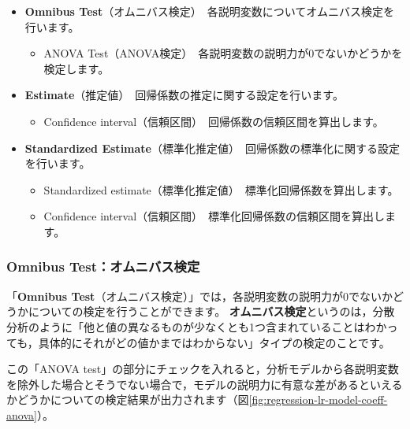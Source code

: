 \documentclass[
  12pt,
  a5jpaper,
  lualatex, ja=standard]{bxjsbook}
\providecommand{\tightlist}{%
  \setlength{\itemsep}{0pt}\setlength{\parskip}{0pt}}
\renewcommand{\emph}[1]{\textbf{\color{emph} #1}}
\newenvironment{jmvsettings}{%
	\begin{center}%
	\begin{tcolorbox}[%
		title=設定項目,
		colframe=gmoji,
		colbacktitle=gmoji,
		colback=gmoji!2!white,
		breakable,
		width=.9\textwidth,
		]\small\addtolength{\leftmargini}{-3\labelsep}%
	}%
	{\end{tcolorbox}\end{center}}
\begin{document}
\begin{jmvsettings}

\begin{itemize}
\tightlist
\item
  \textbf{Omnibus Test}（オムニバス検定）　各説明変数についてオムニバス検定を行います。

  \begin{itemize}
  \tightlist
  \item
    ANOVA Test（ANOVA検定）　各説明変数の説明力が0でないかどうかを検定します。
  \end{itemize}
\item
  \textbf{Estimate}（推定値）　回帰係数の推定に関する設定を行います。

  \begin{itemize}
  \tightlist
  \item
    Confidence interval（信頼区間）　回帰係数の信頼区間を算出します。
  \end{itemize}
\item
  \textbf{Standardized Estimate}（標準化推定値）　回帰係数の標準化に関する設定を行います。

  \begin{itemize}
  \tightlist
  \item
    Standardized estimate（標準化推定値）　標準化回帰係数を算出します。
  \item
    Confidence interval（信頼区間）　標準化回帰係数の信頼区間を算出します。
  \end{itemize}
\end{itemize}

\end{jmvsettings}

\hypertarget{omnibus-testux30aaux30e0ux30cbux30d0ux30b9ux691cux5b9a}{%
\subsubsection*{Omnibus Test：オムニバス検定}\label{omnibus-testux30aaux30e0ux30cbux30d0ux30b9ux691cux5b9a}}

「\textbf{Omnibus Test}（オムニバス検定）」では，各説明変数の説明力が0でないかどうかについての検定を行うことができます。\emph{オムニバス検定}というのは，分散分析のように「他と値の異なるものが少なくとも1つ含まれていることはわかっても，具体的にそれがどの値かまではわからない」タイプの検定のことです。

この「ANOVA test」の部分にチェックを入れると，分析モデルから各説明変数を除外した場合とそうでない場合で，モデルの説明力に有意な差があるといえるかどうかについての検定結果が出力されます（図\ref{fig:regression-lr-model-coeff-anova}）。
\end{document}
